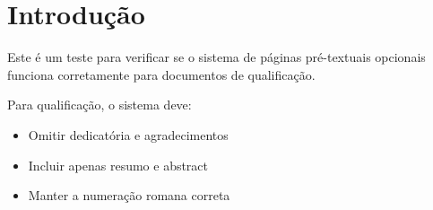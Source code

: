 \documentclass[qualificacao,onehalfspacing]{UnB-PPGT}
\begin{document}

\textual

\chapter{Introdução}

Este é um teste para verificar se o sistema de páginas pré-textuais opcionais 
funciona corretamente para documentos de qualificação.

Para qualificação, o sistema deve:
\begin{itemize}
\item Omitir dedicatória e agradecimentos
\item Incluir apenas resumo e abstract
\item Manter a numeração romana correta
\end{itemize}
\end{document}
